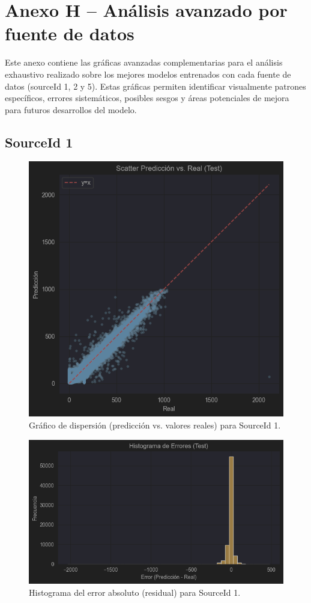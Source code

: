 \section*{Anexo H – Análisis avanzado por fuente de datos}
\label{anexo:analisis_avanzado}

Este anexo contiene las gráficas avanzadas complementarias para el análisis exhaustivo realizado sobre los mejores modelos entrenados con cada fuente de datos (sourceId 1, 2 y 5). Estas gráficas permiten identificar visualmente patrones específicos, errores sistemáticos, posibles sesgos y áreas potenciales de mejora para futuros desarrollos del modelo.

\subsection*{SourceId 1}

\begin{figure}[H]
	\centering
	\includegraphics[width=0.75\linewidth]{includes/cap5/graphs/advanced/sid1_scatter_predicted_vs_actual.png}
	\caption{Gráfico de dispersión (predicción vs. valores reales) para SourceId 1.}
	\label{fig:sid1_scatter}
\end{figure}

\begin{figure}[H]
	\centering
	\includegraphics[width=0.75\linewidth]{includes/cap5/graphs/advanced/sid1_error_histogram_predicted_vs_actual.png}
	\caption{Histograma del error absoluto (residual) para SourceId 1.}
	\label{fig:sid1_histograma_error}
\end{figure}

